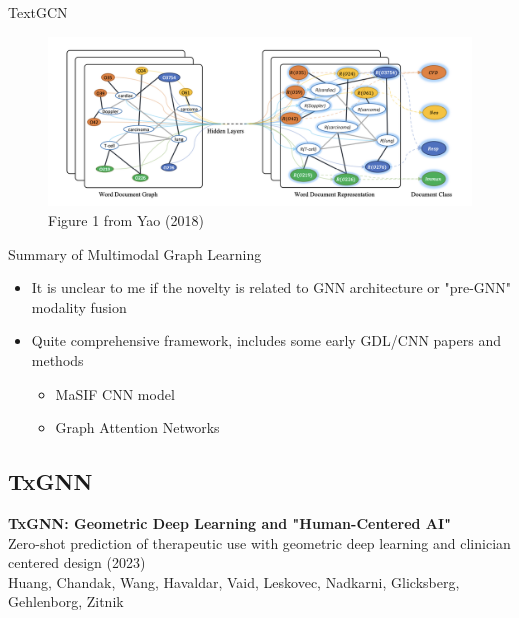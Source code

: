 \documentclass{beamer}
\begin{document}
\begin{frame}{TextGCN}
    \begin{figure}
        \centering 
        \includegraphics[scale=0.6]{TextGCN_Yao_Fig2.png}
        \caption{Figure 1 from Yao (2018) \cite{yao_graph_2018}}
    \end{figure}
\end{frame}


\begin{frame}{Summary of Multimodal Graph Learning}
    \begin{itemize}\setlength\itemsep{6mm}
        \item It is unclear to me if the novelty is related to GNN architecture or "pre-GNN" modality fusion 
        \item Quite comprehensive framework, includes some early GDL/CNN papers and methods 
        \begin{itemize}
            \item MaSIF CNN model
            \item Graph Attention Networks 
        \end{itemize} 
    \end{itemize}
\end{frame}


\subsection{TxGNN}

\begin{frame}{}
    \textbf{\Large TxGNN: Geometric Deep Learning and "Human-Centered AI"}  \\
    \vspace{5mm}
    Zero-shot prediction of therapeutic use with geometric deep learning and clinician centered design (2023) \\ 
    Huang, Chandak, Wang, Havaldar, Vaid, Leskovec, Nadkarni, Glicksberg, Gehlenborg, Zitnik
\end{frame}
\end{document}
